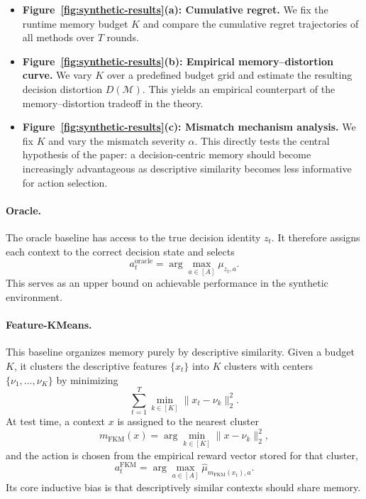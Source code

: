 \documentclass{article}
\theoremstyle{plain}
\theoremstyle{definition}
\theoremstyle{remark}
\begin{document}
\begin{itemize}
    \item \textbf{Figure~\ref{fig:synthetic-results}(a): Cumulative regret.}  
    We fix the runtime memory budget \(K\) and compare the cumulative regret trajectories of all methods over \(T\) rounds.

    \item \textbf{Figure~\ref{fig:synthetic-results}(b): Empirical memory--distortion curve.}  
    We vary \(K\) over a predefined budget grid and estimate the resulting decision distortion \(D(\mathcal{M})\). 
    This yields an empirical counterpart of the memory--distortion tradeoff in the theory.

    \item \textbf{Figure~\ref{fig:synthetic-results}(c): Mismatch mechanism analysis.}  
    We fix \(K\) and vary the mismatch severity \(\alpha\). 
    This directly tests the central hypothesis of the paper: a decision-centric memory should become increasingly advantageous as descriptive similarity becomes less informative for action selection.
\end{itemize}
\paragraph{Oracle.}
The oracle baseline has access to the true decision identity \(z_t\). 
It therefore assigns each context to the correct decision state and selects
\[
a_t^{\mathrm{oracle}} = \arg\max_{a\in[A]} \mu_{z_t,a}.
\]
This serves as an upper bound on achievable performance in the synthetic environment.
\paragraph{Feature-KMeans.}
This baseline organizes memory purely by descriptive similarity. 
Given a budget \(K\), it clusters the descriptive features \(\{x_t\}\) into \(K\) clusters with centers \(\{\nu_1,\dots,\nu_K\}\) by minimizing
\[
\sum_{t=1}^{T} \min_{k\in[K]} \|x_t - \nu_k\|_2^2.
\]
At test time, a context \(x\) is assigned to the nearest cluster
\[
m_{\mathrm{FKM}}(x) = \arg\min_{k\in[K]} \|x-\nu_k\|_2^2,
\]
and the action is chosen from the empirical reward vector stored for that cluster,
\[
a_t^{\mathrm{FKM}} = \arg\max_{a\in[A]} \hat{\mu}_{m_{\mathrm{FKM}}(x_t),a}.
\]
Its core inductive bias is that descriptively similar contexts should share memory.
\end{document}
